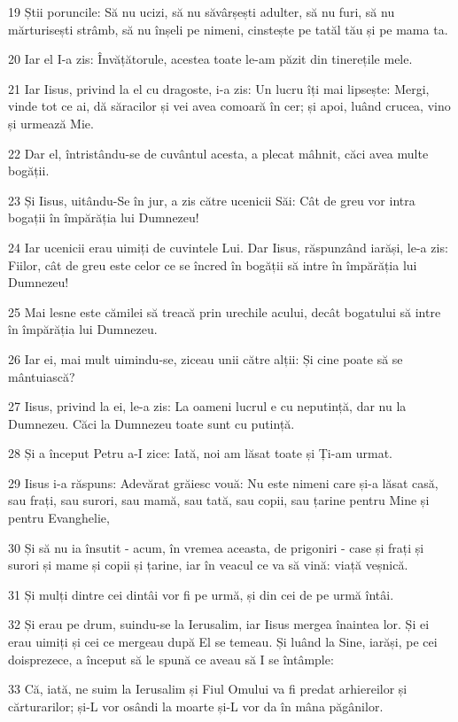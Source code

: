 \par 19 Știi poruncile: Să nu ucizi, să nu săvârșești adulter, să nu furi, să nu mărturisești strâmb, să nu înșeli pe nimeni, cinstește pe tatăl tău și pe mama ta.
\par 20 Iar el I-a zis: Învățătorule, acestea toate le-am păzit din tinerețile mele.
\par 21 Iar Iisus, privind la el cu dragoste, i-a zis: Un lucru îți mai lipsește: Mergi, vinde tot ce ai, dă săracilor și vei avea comoară în cer; și apoi, luând crucea, vino și urmează Mie.
\par 22 Dar el, întristându-se de cuvântul acesta, a plecat mâhnit, căci avea multe bogății.
\par 23 Și Iisus, uitându-Se în jur, a zis către ucenicii Săi: Cât de greu vor intra bogații în împărăția lui Dumnezeu!
\par 24 Iar ucenicii erau uimiți de cuvintele Lui. Dar Iisus, răspunzând iarăși, le-a zis: Fiilor, cât de greu este celor ce se încred în bogății să intre în împărăția lui Dumnezeu!
\par 25 Mai lesne este cămilei să treacă prin urechile acului, decât bogatului să intre în împărăția lui Dumnezeu.
\par 26 Iar ei, mai mult uimindu-se, ziceau unii către alții: Și cine poate să se mântuiască?
\par 27 Iisus, privind la ei, le-a zis: La oameni lucrul e cu neputință, dar nu la Dumnezeu. Căci la Dumnezeu toate sunt cu putință.
\par 28 Și a început Petru a-I zice: Iată, noi am lăsat toate și Ți-am urmat.
\par 29 Iisus i-a răspuns: Adevărat grăiesc vouă: Nu este nimeni care și-a lăsat casă, sau frați, sau surori, sau mamă, sau tată, sau copii, sau țarine pentru Mine și pentru Evanghelie,
\par 30 Și să nu ia însutit - acum, în vremea aceasta, de prigoniri - case și frați și surori și mame și copii și țarine, iar în veacul ce va să vină: viață veșnică.
\par 31 Și mulți dintre cei dintâi vor fi pe urmă, și din cei de pe urmă întâi.
\par 32 Și erau pe drum, suindu-se la Ierusalim, iar Iisus mergea înaintea lor. Și ei erau uimiți și cei ce mergeau după El se temeau. Și luând la Sine, iarăși, pe cei doisprezece, a început să le spună ce aveau să I se întâmple:
\par 33 Că, iată, ne suim la Ierusalim și Fiul Omului va fi predat arhiereilor și cărturarilor; și-L vor osândi la moarte și-L vor da în mâna păgânilor.
